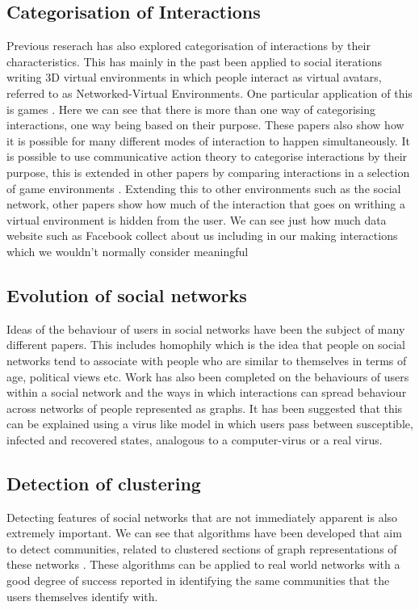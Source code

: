 \documentclass[12pt,a4paper]{article}
\begin{document}
\subsection{Categorisation of Interactions}
Previous reserach has also explored categorisation of interactions by their characteristics. This has mainly in the past been applied to social iterations writing 3D virtual environments in which people interact as virtual avatars, referred to as Networked-Virtual Environments. One particular application of this is games \cite{manninen2000interaction}. Here we can see that there is more than one way of categorising interactions, one way being based on their purpose. These papers also show how it is possible for many different modes of interaction to happen simultaneously. It is possible to use communicative action theory to categorise interactions by their purpose, this is extended in other papers by comparing interactions in a selection of game environments \cite{becker2002social}. Extending this to other environments such as the social network, other papers show how much of the interaction that goes on writhing a virtual environment is hidden from the user. We can see just how much data website such as Facebook collect about us including in our making interactions which we wouldn't normally consider meaningful \cite{schneier2010taxonomy}

\subsection{Evolution of social networks}
Ideas of the behaviour of users in social networks have been the subject of many different papers. This includes homophily \cite{adamic2003social} which is the idea that people on social networks tend to associate with people who are similar to themselves in terms of age, political views etc. Work has also been completed on the behaviours of users within a social network and the ways in which interactions can spread behaviour across networks of people represented as graphs. It has been suggested that this can be explained using a virus like model \cite{centola2010spread} in which users pass between susceptible, infected and recovered states, analogous to a computer-virus or a real virus.

\subsection{Detection of clustering}
Detecting features of social networks that are not immediately apparent is also extremely important. We can see that algorithms have been developed that aim to detect communities, related to clustered sections of graph representations of these networks \cite{newman2004fast}. These algorithms can be applied to real world networks with a good degree of success reported in identifying the same communities that the users themselves identify with.
\end{document}
